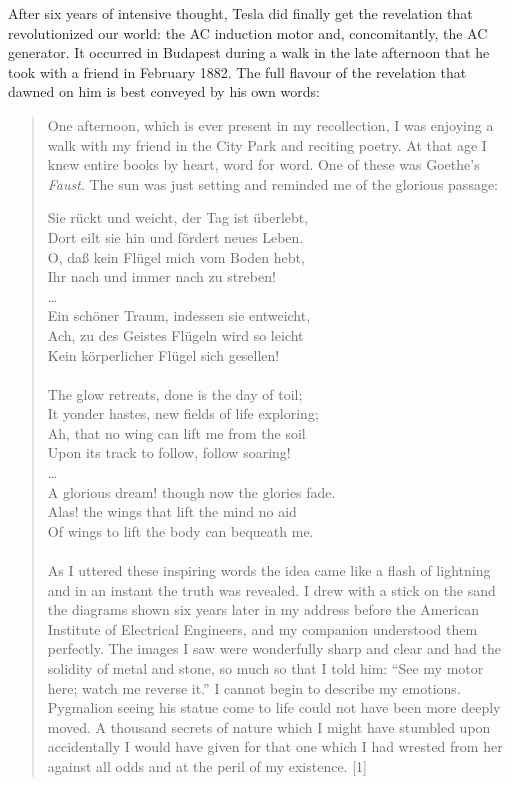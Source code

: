 \documentclass[
  12pt,
  british,
  a4paper,
]{article}
\begin{document}
After six years of intensive thought, Tesla did finally get the
revelation that revolutionized our world: the AC induction motor and,
concomitantly, the AC generator. It occurred in Budapest during a walk
in the late afternoon that he took with a friend in February 1882. The
full flavour of the revelation that dawned on him is best conveyed by
his own words:

\begin{quote}
One afternoon, which is ever present in my recollection, I was enjoying
a walk with my friend in the City Park and reciting poetry. At that age
I knew entire books by heart, word for word. One of these was Goethe's
\emph{Faust}. The sun was just setting and reminded me of the glorious
passage:

Sie rückt und weicht, der Tag ist überlebt,\\
Dort eilt sie hin und fördert neues Leben.\\
O, daß kein Flügel mich vom Boden hebt,\\
Ihr nach und immer nach zu streben!\\
\ldots{}\\
Ein schöner Traum, indessen sie entweicht,\\
Ach, zu des Geistes Flügeln wird so leicht\\
Kein körperlicher Flügel sich gesellen!\\
~\\
The glow retreats, done is the day of toil;\\
It yonder hastes, new fields of life exploring;\\
Ah, that no wing can lift me from the soil\\
Upon its track to follow, follow soaring!\\
\ldots{}\\
A glorious dream! though now the glories fade.\\
Alas! the wings that lift the mind no aid\\
Of wings to lift the body can bequeath me.\\
~\\

As I uttered these inspiring words the idea came like a flash of
lightning and in an instant the truth was revealed. I drew with a stick
on the sand the diagrams shown six years later in my address before the
American Institute of Electrical Engineers, and my companion understood
them perfectly. The images I saw were wonderfully sharp and clear and
had the solidity of metal and stone, so much so that I told him: ``See
my motor here; watch me reverse it.'' I cannot begin to describe my
emotions. Pygmalion seeing his statue come to life could not have been
more deeply moved. A thousand secrets of nature which I might have
stumbled upon accidentally I would have given for that one which I had
wrested from her against all odds and at the peril of my existence.
{[}1{]}
\end{quote}
\end{document}
